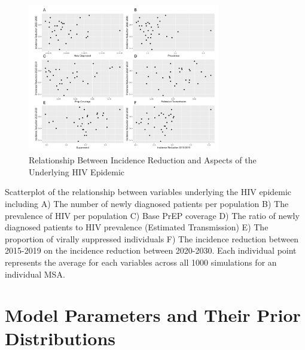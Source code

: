 \documentclass{article}
\begin{document}
\begin{figure}[H]
	\centering
	\caption{Relationship Between Incidence Reduction and Aspects of the Underlying HIV Epidemic}
	\includegraphics[width=0.75\textwidth]{images/FigureS7}
\end{figure}

Scatterplot of the relationship between variables underlying the HIV epidemic including A)  The number of newly diagnosed patients per population B) The prevalence of HIV per population C) Base PrEP coverage D) The ratio of newly diagnosed patients to HIV prevalence (Estimated Transmission) E) The proportion of virally suppressed individuals F) The incidence reduction between 2015-2019 on the incidence reduction between 2020-2030. Each individual point represents the average for each variables across all 1000 simulations for an individual MSA. 

\newpage
\section{Model Parameters and Their Prior Distributions}
\tabulinesep=2pt
\end{document}
